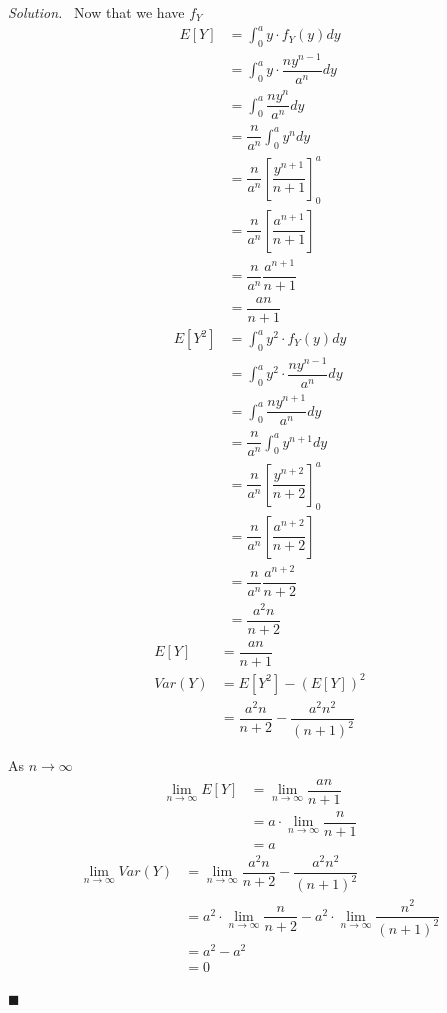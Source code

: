 \documentclass[11pt]{article}
\newenvironment{solution}
{\par\medskip\noindent\textit{Solution.}\ }
{\hfill$\blacksquare$\par\medskip}
\begin{document}
\begin{solution}
        Now that we have $f_Y$
        \begin{align*}
            E[Y] &= \int_{0}^{a} y \cdot f_Y(y) dy \\
            &= \int_{0}^{a} y \cdot \dfrac{ny^{n-1}}{a^n} dy \\
            &= \int_{0}^{a} \dfrac{ny^n}{a^n} dy \\
            &= \dfrac{n}{a^n} \int_{0}^{a} y^n dy \\
            &= \dfrac{n}{a^n} \left[ \dfrac{y^{n + 1}}{n + 1} \right]_{0}^{a} \\
            &= \dfrac{n}{a^n} \left[ \dfrac{a^{n + 1}}{n + 1} \right] \\
            &= \dfrac{n}{a^n} \dfrac{a^{n + 1}}{n + 1} \\
            &= \dfrac{an}{n + 1}
        \end{align*}
        \begin{align*}
            E[Y^2] &= \int_{0}^{a} y^2 \cdot f_Y(y) dy \\
            &= \int_{0}^{a} y^2 \cdot \dfrac{ny^{n-1}}{a^n} dy \\
            &= \int_{0}^{a} \dfrac{ny^{n + 1}}{a^n} dy \\
            &= \dfrac{n}{a^n} \int_{0}^{a} y^{n + 1} dy \\
            &= \dfrac{n}{a^n} \left[ \dfrac{y^{n + 2}}{n + 2} \right]_{0}^{a} \\
            &= \dfrac{n}{a^n} \left[ \dfrac{a^{n + 2}}{n + 2} \right] \\
            &= \dfrac{n}{a^n} \dfrac{a^{n + 2}}{n + 2} \\
            &= \dfrac{a^2 n}{n + 2}
        \end{align*}
        \begin{align*}
            E[Y] &= \dfrac{an}{n + 1} \\
            Var(Y) &= E[Y^2] - (E[Y])^2 \\
            &= \dfrac{a^2 n}{n + 2} - \dfrac{a^2 n^2}{(n + 1)^2}
        \end{align*}

        As $n \to \infty$
        \begin{align*}
            \lim_{n \to \infty} E[Y] &= \lim_{n \to \infty} \dfrac{an}{n + 1} \\
            &= a \cdot \lim_{n \to \infty} \dfrac{n}{n + 1} \\
            &= a
        \end{align*}
        \begin{align*}
            \lim_{n \to \infty} Var(Y) &= \lim_{n \to \infty} \dfrac{a^2 n}{n + 2} - \dfrac{a^2 n^2}{(n + 1)^2} \\
            &= a^2 \cdot \lim_{n \to \infty} \dfrac{n}{n + 2} - a^2 \cdot \lim_{n \to \infty} \dfrac{n^2}{(n + 1)^2} \\
            &= a^2 - a^2 \\
            &= 0
        \end{align*}


\end{solution}
\end{document}
